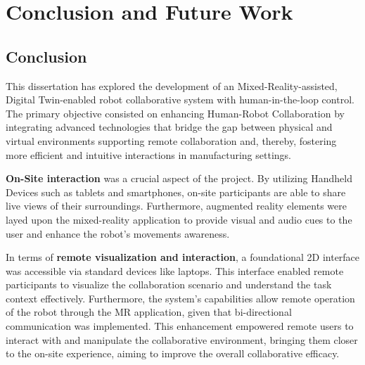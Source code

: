 \chapter{Conclusion and Future Work}%



\section{Conclusion}

This dissertation has explored the development of an Mixed-Reality-assisted, Digital Twin-enabled robot collaborative system with human-in-the-loop control. The primary objective consisted on enhancing Human-Robot Collaboration by integrating advanced technologies that bridge the gap between physical and virtual environments supporting remote collaboration and, thereby, fostering more efficient and intuitive interactions in manufacturing settings.

\textbf{On-Site interaction} was a crucial aspect of the project. By utilizing Handheld Devices such as tablets and smartphones, on-site participants are able to share live views of their surroundings. Furthermore, augmented reality elements were layed upon the mixed-reality application to provide visual and audio cues to the user and enhance the robot's movements awareness. 

In terms of \textbf{remote visualization and interaction}, a foundational 2D interface was accessible via standard devices like laptops. This interface enabled remote participants to visualize the collaboration scenario and understand the task context effectively. Furthermore, the system's capabilities allow remote operation of the robot through the \ac{MR} application, given that bi-directional communication was implemented. This enhancement empowered remote users to interact with and manipulate the collaborative environment, bringing them closer to the on-site experience, aiming to improve the overall collaborative efficacy.



